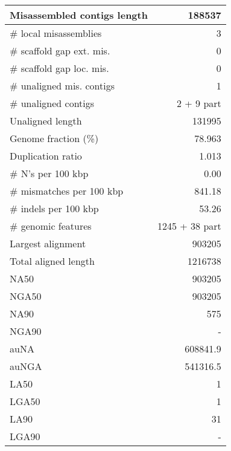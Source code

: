 \documentclass[12pt,a4paper]{article}
\begin{document}
\begin{table}[ht]
\begin{center}
\begin{tabular}{|l*{1}{|r}|}
Misassembled contigs length & 188537 \\ \hline
\# local misassemblies & 3 \\ \hline
\# scaffold gap ext. mis. & 0 \\ \hline
\# scaffold gap loc. mis. & 0 \\ \hline
\# unaligned mis. contigs & 1 \\ \hline
\# unaligned contigs & 2 + 9 part \\ \hline
Unaligned length & 131995 \\ \hline
Genome fraction (\%) & 78.963 \\ \hline
Duplication ratio & 1.013 \\ \hline
\# N's per 100 kbp & 0.00 \\ \hline
\# mismatches per 100 kbp & 841.18 \\ \hline
\# indels per 100 kbp & 53.26 \\ \hline
\# genomic features & 1245 + 38 part \\ \hline
Largest alignment & 903205 \\ \hline
Total aligned length & 1216738 \\ \hline
NA50 & 903205 \\ \hline
NGA50 & 903205 \\ \hline
NA90 & 575 \\ \hline
NGA90 & - \\ \hline
auNA & 608841.9 \\ \hline
auNGA & 541316.5 \\ \hline
LA50 & 1 \\ \hline
LGA50 & 1 \\ \hline
LA90 & 31 \\ \hline
LGA90 & - \\ \hline
\end{tabular}
\end{center}
\end{table}
\end{document}
